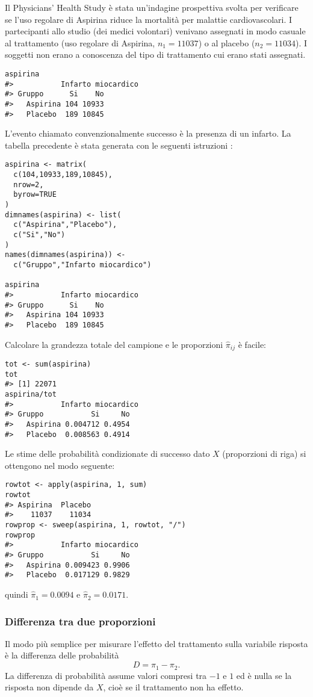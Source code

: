 \begin{exmp}
Il Physicians' Health Study è stata un'indagine prospettiva svolta per verificare se l'uso regolare di Aspirina riduce la mortalità per malattie cardiovascolari. 
I partecipanti allo studio (dei medici volontari) venivano assegnati in modo casuale al trattamento (uso regolare di Aspirina, $n_1=11037$) o al placebo ($n_2=11034$). I soggetti non erano a conoscenza del tipo di trattamento cui erano stati assegnati.
\begin{lstlisting}
aspirina
#>           Infarto miocardico
#> Gruppo      Si    No
#>   Aspirina 104 10933
#>   Placebo  189 10845
\end{lstlisting}
L'evento chiamato convenzionalmente successo è la presenza di un infarto.
La tabella precedente è stata generata con le seguenti istruzioni \R:
\begin{lstlisting}
aspirina <- matrix(
  c(104,10933,189,10845),
  nrow=2, 
  byrow=TRUE
)
dimnames(aspirina) <- list(
  c("Aspirina","Placebo"),
  c("Si","No")
)
names(dimnames(aspirina)) <- 
  c("Gruppo","Infarto miocardico")

aspirina
#>           Infarto miocardico
#> Gruppo      Si    No
#>   Aspirina 104 10933
#>   Placebo  189 10845
\end{lstlisting}
Calcolare la grandezza totale del campione e le proporzioni $\hat{\pi}_{ij}$ è facile:
\begin{lstlisting}
tot <- sum(aspirina)
tot
#> [1] 22071
aspirina/tot
#>           Infarto miocardico
#> Gruppo           Si     No
#>   Aspirina 0.004712 0.4954
#>   Placebo  0.008563 0.4914
\end{lstlisting}
Le stime delle probabilità condizionate di successo dato $X$ (proporzioni di riga) si ottengono nel modo seguente:
\begin{lstlisting}
rowtot <- apply(aspirina, 1, sum)
rowtot
#> Aspirina  Placebo
#>    11037    11034
rowprop <- sweep(aspirina, 1, rowtot, "/")
rowprop
#>           Infarto miocardico
#> Gruppo           Si     No
#>   Aspirina 0.009423 0.9906
#>   Placebo  0.017129 0.9829
\end{lstlisting}
quindi $\hat{\pi}_1=0.0094$ e $\hat{\pi}_2=0.0171$.
\end{exmp}


\subsubsection{Differenza tra due proporzioni}

Il modo più semplice per misurare l'effetto del trattamento sulla variabile risposta è la differenza delle probabilità
\[
D =\pi_1 - \pi_2.
\]
La differenza di probabilità assume valori compresi tra $-1$ e $1$ ed è nulla se la risposta non dipende da $X$, cioè se il trattamento non ha effetto.

